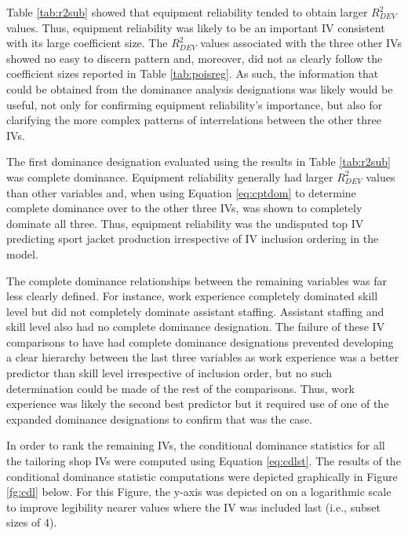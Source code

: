 \documentclass[man]{apa7}
\begin{document}
	Table \ref{tab:r2sub} showed that equipment reliability tended to obtain larger $R^2_{DEV}$ values.
	Thus, equipment reliability was likely to be an important IV consistent with its large coefficient size. 
	The $R^2_{DEV}$ values associated with the three other IVs showed no easy to discern pattern and, moreover, did not as clearly follow the coefficient sizes reported in Table \ref{tab:poisreg}.
	As such, the information that could be obtained from the dominance analysis designations was likely would be useful, not only for confirming equipment reliability's importance, but also for clarifying the more complex patterns of interrelations between the other three IVs.
	
	The first dominance designation evaluated using the results in Table \ref{tab:r2sub} was complete dominance.
	Equipment reliability generally had larger $R^2_{DEV}$ values than other variables and, when using Equation \ref{eq:cptdom} to determine complete dominance over to the other three IVs, was shown to completely dominate all three.
	Thus, equipment reliability was the undisputed top IV predicting sport jacket production irrespective of IV inclusion ordering in the model.

	The complete dominance relationships between the remaining variables was far less clearly defined. 
	For instance, work experience completely dominated skill level but did not completely dominate assistant staffing.
	Assistant staffing and skill level also had no complete dominance designation.
	The failure of these IV comparisons to have had complete dominance designations prevented developing a clear hierarchy between the last three variables as work experience was a better predictor than skill level irrespective of inclusion order, but no such determination could be made of the rest of the comparisons.
	Thus, work experience was likely the second best predictor but it required use of one of the expanded dominance designations to confirm that was the case.
	
	In order to rank the remaining IVs, the conditional dominance statistics for all the tailoring shop IVs were computed using Equation \ref{eq:cdlst}.
	The results of the conditional dominance statistic computations were depicted graphically in Figure \ref{fg:cdl} below.
	For this Figure, the y-axis was depicted on on a logarithmic scale to improve legibility nearer values where the IV was included last (i.e., subset sizes of 4).
	
\end{document}
